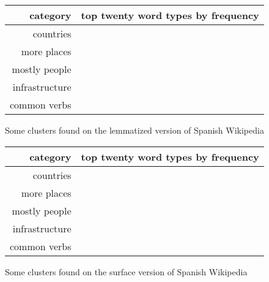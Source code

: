 \begin{figure*}[t!]
  \begin{tabular}{|r|p{10cm}|}
    \hline
    category  & top twenty word types by frequency \\
    \hline
    countries &  \\
    \hline
    more places & \\
    \hline
    mostly people & \\
    \hline
    infrastructure & \\
    \hline
    common verbs & \\
    \hline
  \end{tabular}
\caption{Some clusters found on the lemmatized version of Spanish Wikipedia}
\label{fig:clusters-wikipedia-lemma}
\end{figure*}

\begin{figure*}[t!]
  \begin{tabular}{|r|p{10cm}|}
    \hline
    category  & top twenty word types by frequency \\
    \hline
    countries &  \\
    \hline
    more places & \\
    \hline
    mostly people & \\
    \hline
    infrastructure & \\
    \hline
    common verbs & \\
    \hline
  \end{tabular}
\caption{Some clusters found on the surface version of Spanish Wikipedia}
\label{fig:clusters-wikipedia-surface}
\end{figure*}
